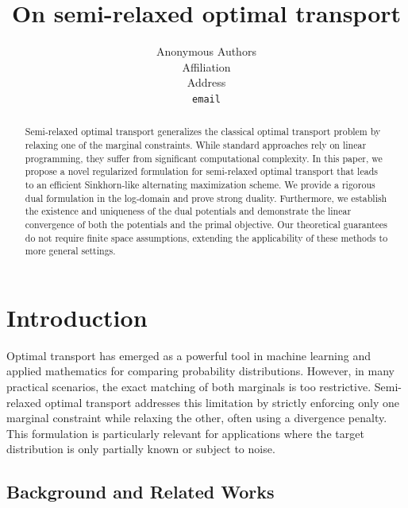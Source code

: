 \documentclass{article}
\title{On semi-relaxed optimal transport}
\author{%
  Anonymous Authors \\
  Affiliation \\
  Address \\
  \texttt{email}
}
\begin{document}
\maketitle

\begin{abstract}
Semi-relaxed optimal transport generalizes the classical optimal transport problem by relaxing one of the marginal constraints. While standard approaches rely on linear programming, they suffer from significant computational complexity. In this paper, we propose a novel regularized formulation for semi-relaxed optimal transport that leads to an efficient Sinkhorn-like alternating maximization scheme. We provide a rigorous dual formulation in the log-domain and prove strong duality. Furthermore, we establish the existence and uniqueness of the dual potentials and demonstrate the linear convergence of both the potentials and the primal objective. Our theoretical guarantees do not require finite space assumptions, extending the applicability of these methods to more general settings.
\end{abstract}

\section{Introduction}
Optimal transport has emerged as a powerful tool in machine learning and applied mathematics for comparing probability distributions. However, in many practical scenarios, the exact matching of both marginals is too restrictive. Semi-relaxed optimal transport addresses this limitation by strictly enforcing only one marginal constraint while relaxing the other, often using a divergence penalty. This formulation is particularly relevant for applications where the target distribution is only partially known or subject to noise.

\subsection{Background and Related Works}
\end{document}
